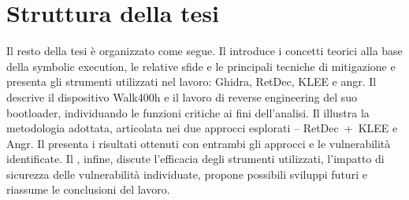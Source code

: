 \section{Struttura della tesi}
\label{subsec:struttura_tesi}
Il resto della tesi è organizzato come segue. Il  introduce i concetti teorici alla base della
symbolic execution, le relative sfide e le principali tecniche di mitigazione e presenta gli
strumenti utilizzati nel lavoro: Ghidra, RetDec, KLEE e angr. Il  descrive il dispositivo
Walk400h e il lavoro di reverse engineering del suo bootloader, individuando le funzioni critiche ai fini
dell'analisi. Il  illustra la metodologia adottata, articolata nei due approcci esplorati --
RetDec~+~KLEE e Angr. Il  presenta i risultati ottenuti con entrambi gli approcci e le
vulnerabilità identificate. Il , infine, discute l'efficacia degli strumenti utilizzati, l'impatto di sicurezza delle vulnerabilità individuate, propone possibili sviluppi futuri e riassume le conclusioni del lavoro.


